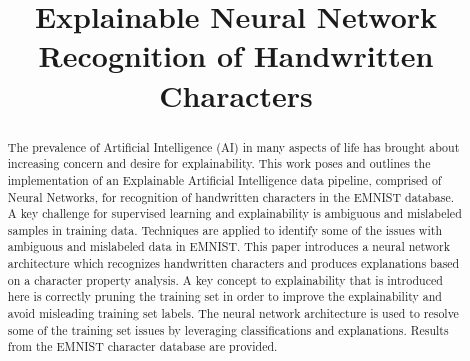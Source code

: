 \documentclass[conference]{IEEEtran}
\begin{document}
\title{
    Explainable Neural Network Recognition of Handwritten Characters
}

\author{
}

\maketitle

\begin{abstract}
    The prevalence of Artificial Intelligence (AI) in many aspects of life has
    brought about increasing concern and desire for explainability.  This work poses
    and outlines the implementation of an Explainable Artificial Intelligence data
    pipeline, comprised of Neural Networks, for recognition of handwritten
    characters in the EMNIST database. A key challenge for supervised learning and
    explainability is ambiguous and mislabeled samples in training data.  Techniques
    are applied to identify some of the issues with ambiguous and mislabeled data in
    EMNIST.  This paper introduces a neural network architecture which recognizes
    handwritten characters and produces explanations based on a character property
    analysis.  A key concept to explainability that is introduced here is correctly
    pruning the training set in order to improve the explainability and avoid
    misleading training set labels. The neural network architecture is used to
    resolve some of the training set issues by leveraging classifications and
    explanations. Results from the EMNIST character database are provided.
\end{abstract}
\end{document}
